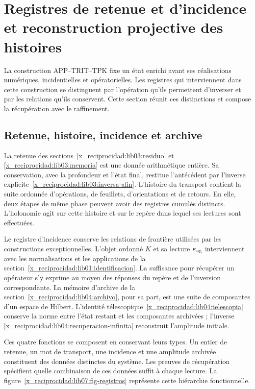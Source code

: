 \chapter{Registres de retenue et d’incidence et reconstruction projective des histoires}
\label{x_reciprocidad:lib07:armonizacion}
La construction APP--TRIT--TPK fixe un état enrichi avant
ses réalisations numériques, incidentielles et opératorielles. Les registres
qui interviennent dans cette construction se distinguent par l’opération
qu’ils permettent d’inverser et par les relations qu’ils conservent. Cette section
réunit ces distinctions et compose la récupération avec le raffinement.

\section{Retenue, histoire, incidence et archive}
La retenue des sections~\ref{x_reciprocidad:lib03:residuo} et
\ref{x_reciprocidad:lib03:memoria} est une donnée arithmétique entière. Sa conservation,
avec la profondeur et l’état final, restitue l’antécédent
par l’inverse explicite~\eqref{x_reciprocidad:lib03:inversa-afin}.
L’histoire du transport contient la suite ordonnée d’opérations,
de feuillets, d’orientations et de retours. En elle, deux étapes de même phase
peuvent avoir des registres cumulés distincts. L’holonomie agit sur
cette histoire et sur le repère dans lequel ses lectures sont effectuées.

Le registre d’incidence conserve les relations de frontière
utilisées par les constructions exceptionnelles. L’objet ordonné \(K\)
et sa lecture \(\kappa_{\rm ag}\) interviennent avec les normalisations
et les applications de la section~\ref{x_reciprocidad:lib01:identificacion}.
La suffisance pour récupérer un opérateur s’y exprime au moyen
des réponses du repère et de l’inversion correspondante.
La mémoire d’archive de la section~\ref{x_reciprocidad:lib04:archivo}, pour sa part,
est une suite de composantes d’un espace de Hilbert. L’identité
télescopique~\eqref{x_reciprocidad:lib04:telescopia} conserve la norme entre l’état
restant et les composantes archivées ; l’inverse
\eqref{x_reciprocidad:lib04:recuperacion-infinita} reconstruit l’amplitude initiale.

Ces quatre fonctions se composent en conservant leurs types. Un entier de retenue, un mot de transport, une incidence et une amplitude archivée constituent des données distinctes du système. Les preuves de récupération spécifient quelle combinaison de ces données suffit à chaque lecture. La figure~\ref{x_reciprocidad:lib07:fig-registros} représente cette hiérarchie fonctionnelle.

